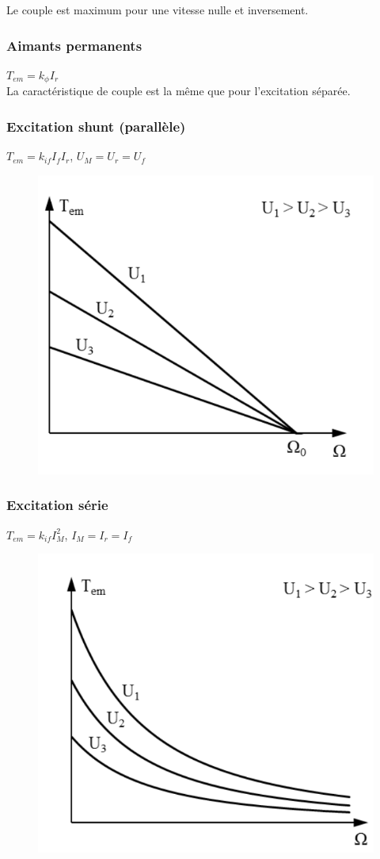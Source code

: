 \documentclass[../main.tex]{subfiles}
\begin{document}
Le couple est maximum pour une vitesse nulle et inversement. \\

\subsubsection{Aimants permanents}
$T_{em} = k_\phi I_r$\\
La caractéristique de couple est la même que pour l'excitation séparée.\\

\subsubsection{Excitation shunt (parallèle)}
$T_{em} = k_{if} I_f I_r$, $U_M = U_r = U_f$\\

\begin{figure}[hbt!]
    \centering
    \includegraphics[width=.5\textwidth]{IMAGES/elec/mshunt.png}
\end{figure}

\subsubsection{Excitation série}
$T_{em} = k_{if} I_M^2$, $I_M = I_r = I_f$ \\

\begin{figure}[hbt!]
    \centering
    \includegraphics[width=.5\textwidth]{IMAGES/elec/mserie.png}
\end{figure}
\end{document}
